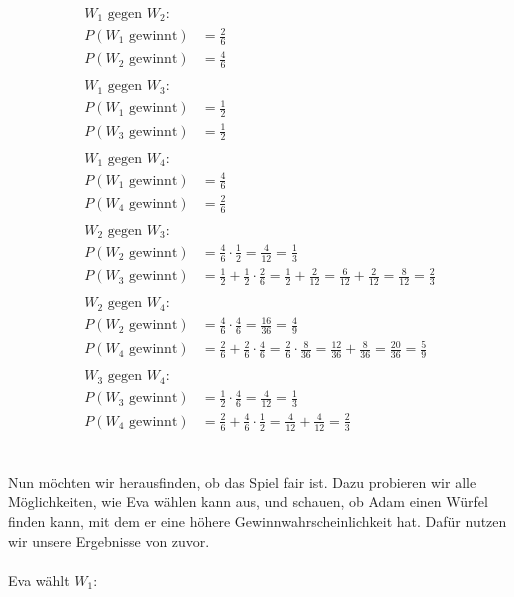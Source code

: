 \documentclass[a4paper]{scrartcl}
\begin{document}
\begin{align*}
	W_1 \text{ gegen } W_2:&\\
	P(W_1\text{ gewinnt}) &= \frac{2}{6}\\
	 P(W_2\text{ gewinnt}) & = \frac{4}{6}\\
	 \\
	 W_1 \text{ gegen } W_3:&\\
	 P(W_1\text{ gewinnt})&= \frac{1}{2}\\
	 P(W_3\text{ gewinnt}) & = \frac{1}{2}\\
	 \\
	 W_1 \text{ gegen } W_4:&\\
	 P(W_1\text{ gewinnt})&= \frac{4}{6}\\
	 P(W_4\text{ gewinnt})& = \frac{2}{6}\\
	 \\
	W_2 \text{ gegen } W_3:&\\
	P(W_2\text{ gewinnt}) &= \frac{4}{6} \cdot \frac{1}{2} = \frac{4}{12} = \frac{1}{3}\\
	P(W_3\text{ gewinnt}) & = \frac{1}{2} + \frac{1}{2} \cdot \frac{2}{6} = \frac{1}{2} + \frac{2}{12} = \frac{6}{12} + \frac{2}{12} = \frac{8}{12} = \frac{2}{3}\\ 
	\\
	W_2 \text{ gegen } W_4:&\\
	P(W_2\text{ gewinnt}) &= \frac{4}{6} \cdot \frac{4}{6} = \frac{16}{36} = \frac{4}{9}\\
	P(W_4\text{ gewinnt}) & = \frac{2}{6} + \frac{2}{6} \cdot \frac{4}{6} = \frac{2}{6} \cdot \frac{8}{36} = \frac{12}{36} + \frac{8}{36} = \frac{20}{36} = \frac{5}{9}\\
	\\
	W_3 \text{ gegen } W_4:&\\
	P(W_3\text{ gewinnt}) &= \frac{1}{2} \cdot\frac{4}{6} = \frac{4}{12} = \frac{1}{3}\\
	P(W_4\text{ gewinnt}) & = \frac{2}{6} + \frac{4}{6} \cdot \frac{1}{2} = \frac{4}{12} + \frac{4}{12} = \frac{2}{3}	
\end{align*}
\\
\\
Nun möchten wir herausfinden, ob das Spiel fair ist. Dazu probieren wir alle Möglichkeiten, wie Eva wählen kann aus, und schauen, ob Adam einen Würfel finden kann, mit dem er eine höhere Gewinnwahrscheinlichkeit hat. Dafür nutzen wir unsere Ergebnisse von zuvor.\\
\\
Eva wählt $W_1$:\\
\end{document}
